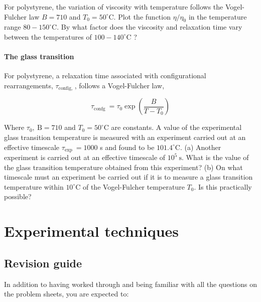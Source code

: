 \documentclass[
  letterpaper,
  enabledeprecatedfontcommands]{report}
\begin{document}
For polystyrene, the variation of viscosity with temperature follows the
Vogel-Fulcher law \(B=710\) and \(T_{0}=50^{\circ} \mathrm{C}\). Plot
the function \(\eta / \eta_{0}\) in the temperature range
\(80-150^{\circ} \mathrm{C}\). By what factor does the viscosity and
relaxation time vary between the temperatures of
\(100-140^{\circ} \mathrm{C}\) ?

\subsection{The glass transition}\label{the-glass-transition}

For polystyrene, a relaxation time associated with configurational
rearrangements, \(\tau_{\text {config, }}\), follows a Vogel-Fulcher
law,

\[
\tau_{\text {confg }}=\tau_{0} \exp \left(\frac{B}{T-T_{0}}\right)
\]

Where \(\tau_{0}, \mathrm{~B}=710\) and \(T_{0}=50^{\circ} \mathrm{C}\)
are constants. A value of the experimental glass transition temperature
is measured with an experiment carried out at an effective timescale
\(\tau_{\text {exp }}=1000\) s and found to be
\(101.4^{\circ} \mathrm{C}\). (a) Another experiment is carried out at
an effective timescale of \(10^{5} \mathrm{~s}\). What is the value of
the glass transition temperature obtained from this experiment? (b) On
what timescale must an experiment be carried out if it is to measure a
glass transition temperature within \(10^{\circ} \mathrm{C}\) of the
Vogel-Fulcher temperature \(T_{0}\). Is this practically possible?

\part{Experimental techniques}

\cleardoublepage
{}
{}
\appendix

\chapter{Revision guide}\label{revision-guide}

In addition to having worked through and being familiar with all the
questions on the problem sheets, you are expected to:
\end{document}
